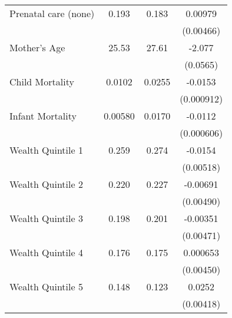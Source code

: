 \begin{table}[htbp]
\begin{tabular}{l*{1}{ccc}}
Prenatal care (none)&       0.193&       0.183&     0.00979\sym{*}  \\
                    &            &            &   (0.00466)         \\
Mother's Age        &       25.53&       27.61&      -2.077\sym{***}\\
                    &            &            &    (0.0565)         \\
Child Mortality     &      0.0102&      0.0255&     -0.0153\sym{***}\\
                    &            &            &  (0.000912)         \\
Infant Mortality    &     0.00580&      0.0170&     -0.0112\sym{***}\\
                    &            &            &  (0.000606)         \\
Wealth Quintile 1   &       0.259&       0.274&     -0.0154\sym{**} \\
                    &            &            &   (0.00518)         \\
Wealth Quintile 2   &       0.220&       0.227&    -0.00691         \\
                    &            &            &   (0.00490)         \\
Wealth Quintile 3   &       0.198&       0.201&    -0.00351         \\
                    &            &            &   (0.00471)         \\
Wealth Quintile 4   &       0.176&       0.175&    0.000653         \\
                    &            &            &   (0.00450)         \\
Wealth Quintile 5   &       0.148&       0.123&      0.0252\sym{***}\\
                    &            &            &   (0.00418)         \\
\bottomrule
\end{tabular}
\end{table}
